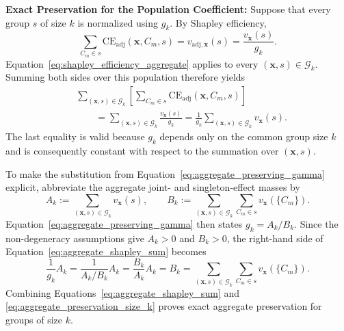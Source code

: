 \begin{math_box}[label=ma:dataset_average_preservation]
    \smallskip
    \textbf{Exact Preservation for the Population Coefficient:} Suppose that
    every group $s$ of size $k$ is normalized using $g_k$. By Shapley efficiency,
    \begin{equation}
        \label{eq:shapley_efficiency_aggregate}
        \sum_{C_m\in s}
        \mathrm{CE}_{\mathrm{adj}}(\mathbf{x},C_m,s)
        =v_{\mathrm{adj},\mathbf{x}}(s)
        =\frac{v_{\mathbf{x}}(s)}{g_k}.
    \end{equation}
    Equation~\ref{eq:shapley_efficiency_aggregate} applies to every
    $(\mathbf{x},s)\in\mathcal{G}_k$. Summing both sides over this population
    therefore yields
    \begin{equation}
        \label{eq:aggregate_shapley_sum}
        \begin{aligned}
            &\sum_{(\mathbf{x},s)\in\mathcal{G}_k}
            \left[
                \sum_{C_m\in s}
                \mathrm{CE}_{\mathrm{adj}}(\mathbf{x},C_m,s)
            \right] \\
            &\qquad=
            \sum_{(\mathbf{x},s)\in\mathcal{G}_k}
            \frac{v_{\mathbf{x}}(s)}{g_k}
            =
            \frac{1}{g_k}
            \sum_{(\mathbf{x},s)\in\mathcal{G}_k}v_{\mathbf{x}}(s).
        \end{aligned}
    \end{equation}
    The last equality is valid because $g_k$ depends only on the common group
    size $k$ and is consequently constant with respect to the summation over
    $(\mathbf{x},s)$.

    To make the substitution from
    Equation~\ref{eq:aggregate_preserving_gamma} explicit, abbreviate the
    aggregate joint- and singleton-effect masses by
    \begin{equation*}
        A_k
        :=\sum_{(\mathbf{x},s)\in\mathcal{G}_k}v_{\mathbf{x}}(s),
        \qquad
        B_k
        :=\sum_{(\mathbf{x},s)\in\mathcal{G}_k}
        \sum_{C_m\in s}v_{\mathbf{x}}(\{C_m\}).
    \end{equation*}
    Equation~\ref{eq:aggregate_preserving_gamma} then states
    $g_k=A_k/B_k$. Since the non-degeneracy assumptions give $A_k>0$ and
    $B_k>0$, the right-hand side of
    Equation~\ref{eq:aggregate_shapley_sum} becomes
    \begin{equation}
        \label{eq:aggregate_preservation_size_k}
        \frac{1}{g_k}A_k
        =\frac{1}{A_k/B_k}A_k
        =\frac{B_k}{A_k}A_k
        =B_k
        =\sum_{(\mathbf{x},s)\in\mathcal{G}_k}
        \sum_{C_m\in s}v_{\mathbf{x}}(\{C_m\}).
    \end{equation}
    Combining Equations~\ref{eq:aggregate_shapley_sum} and
    \ref{eq:aggregate_preservation_size_k} proves exact aggregate preservation
    for groups of size $k$.


\end{math_box}
